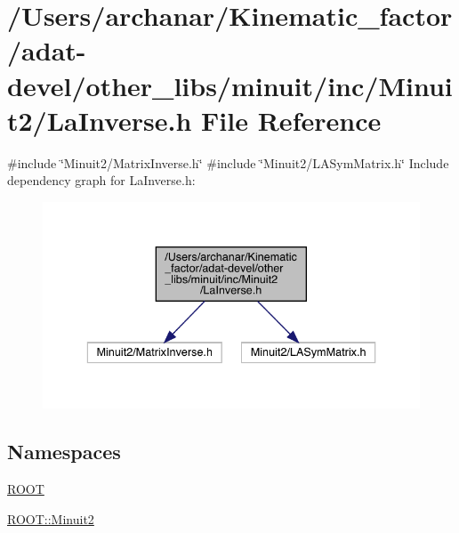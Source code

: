 \hypertarget{adat-devel_2other__libs_2minuit_2inc_2Minuit2_2LaInverse_8h}{}\section{/\+Users/archanar/\+Kinematic\+\_\+factor/adat-\/devel/other\+\_\+libs/minuit/inc/\+Minuit2/\+La\+Inverse.h File Reference}
\label{adat-devel_2other__libs_2minuit_2inc_2Minuit2_2LaInverse_8h}
{\ttfamily \#include \char`\"{}Minuit2/\+Matrix\+Inverse.\+h\char`\"{}}\newline
{\ttfamily \#include \char`\"{}Minuit2/\+L\+A\+Sym\+Matrix.\+h\char`\"{}}\newline
Include dependency graph for La\+Inverse.\+h\+:
\nopagebreak
\begin{figure}[H]
\begin{center}
\leavevmode
\includegraphics[width=336pt]{da/de1/adat-devel_2other__libs_2minuit_2inc_2Minuit2_2LaInverse_8h__incl}
\end{center}
\end{figure}
\subsection*{Namespaces}
\begin{DoxyCompactItemize}
\item 
 \mbox{\hyperlink{namespaceROOT}{R\+O\+OT}}
\item 
 \mbox{\hyperlink{namespaceROOT_1_1Minuit2}{R\+O\+O\+T\+::\+Minuit2}}
\end{DoxyCompactItemize}

